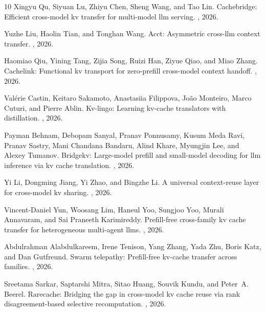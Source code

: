 \documentclass[11pt]{article}
\begin{document}
\begin{thebibliography}{10}
Xingyu Qu, Siyuan Lu, Zhiyu Chen, Sheng Wang, and Tao Lin.
\newblock Cachebridge: Efficient cross-model kv transfer for multi-model llm
  serving.
, 2026.

Yuzhe Liu, Haolin Tian, and Tonghan Wang.
\newblock Acct: Asymmetric cross-llm context transfer.
, 2026.

Haomiao Qiu, Yining Tang, Zijia Song, Ruizi Han, Ziyue Qiao, and Miao Zhang.
\newblock Cachelink: Functional kv transport for zero-prefill cross-model context
  handoff.
, 2026.

Val{\'e}rie Castin, Keitaro Sakamoto, Anastasiia Filippova, Jo{\~a}o Monteiro,
  Marco Cuturi, and Pierre Ablin.
\newblock Kv-lingo: Learning kv-cache translators with distillation.
, 2026.

Payman Behnam, Debopam Sanyal, Pranav Ponnusamy, Kusum Meda Ravi, Pranav Sastry,
  Mani Chandana Bandaru, Alind Khare, Myungjin Lee, and Alexey Tumanov.
\newblock Bridgekv: Large-model prefill and small-model decoding for llm inference
  via kv cache translation.
, 2026.

Yi Li, Dongming Jiang, Yi Zhao, and Bingzhe Li.
\newblock A universal context-reuse layer for cross-model kv sharing.
, 2026.

Vincent-Daniel Yun, Woosang Lim, Haneul Yoo, Sungjoo Yoo, Murali Annavaram, and
  Sai Praneeth Karimireddy.
\newblock Prefill-free cross-family kv cache transfer for heterogeneous multi-agent
  llms.
, 2026.

Abdulrahman Alabdulkareem, Irene Tenison, Yang Zhang, Yada Zhu, Boris Katz, and
  Dan Gutfreund.
\newblock Swarm telepathy: Prefill-free kv-cache transfer across families.
, 2026.

Sreetama Sarkar, Saptarshi Mitra, Sitao Huang, Souvik Kundu, and Peter~A. Beerel.
\newblock Rarecache: Bridging the gap in cross-model kv cache reuse via rank
  disagreement-based selective recomputation.
, 2026.


\end{thebibliography}
\end{document}
